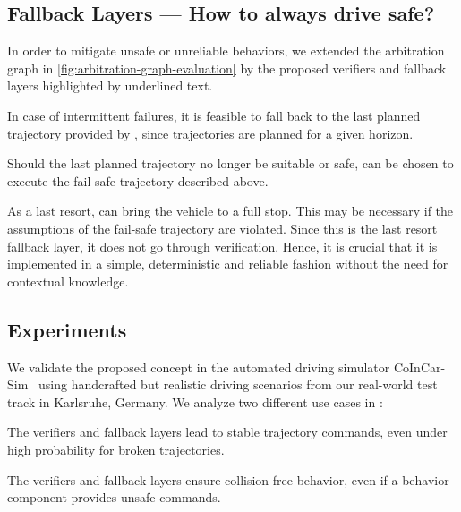 


\subsection{Fallback Layers --- How to always \textbf{drive safe}?}

In order to mitigate unsafe or unreliable behaviors,
we extended the arbitration graph in \cref{fig:arbitration-graph-evaluation}
by the proposed verifiers and fallback layers
highlighted by underlined text.

In case of intermittent failures,
it is feasible to fall back to the last planned trajectory
provided by ,
since trajectories are planned for a given horizon.

Should the last planned trajectory no longer be suitable or safe,
 can be chosen to execute the fail-safe trajectory described above.

As a last resort,  can bring the vehicle to a full stop.
This may be necessary if the assumptions of the fail-safe trajectory are violated.
%
Since this is the last resort fallback layer,
it does not go through verification.
Hence, it is crucial that it is implemented in a simple, deterministic and reliable fashion
without the need for contextual knowledge.




\subsection{Experiments}

We validate the proposed concept in the automated driving simulator CoInCar-Sim~\cite{naumannCoInCarSimOpenSourceSimulation2018}
using handcrafted but realistic driving scenarios
from our real-world test track in Karlsruhe, Germany.
We analyze two different use cases
in \cite{orzechowskiVerhaltensentscheidungFuerAutomatisierte2023}:
%
\begin{description}[align=left]
    \item[Ensuring driveability]
        The verifiers and fallback layers lead to stable trajectory commands,
        even under high probability for broken trajectories.
    \item[Guaranteeing vehicle safety]
        The verifiers and fallback layers ensure collision free behavior,
        even if a behavior component provides unsafe commands.
\end{description}

